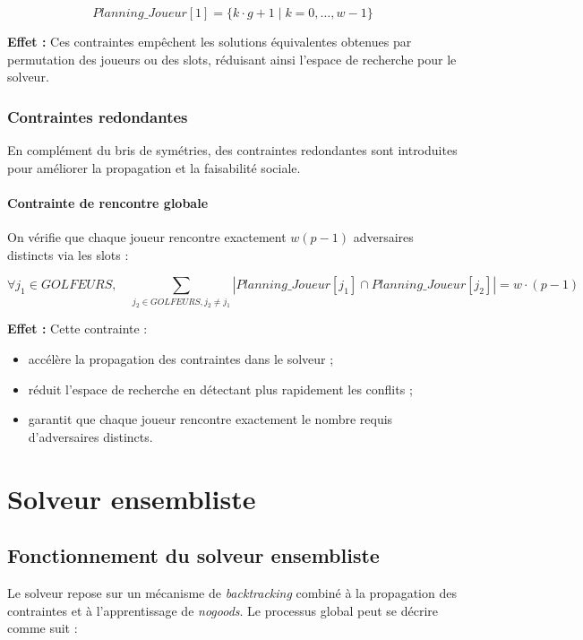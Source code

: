\documentclass{article}
\begin{document}
\[
Planning\_Joueur[1] = \{ k \cdot g + 1 \mid k = 0, \dots, w-1 \}
\]

\noindent
\textbf{Effet :} Ces contraintes empêchent les solutions équivalentes obtenues par permutation des joueurs ou des slots, réduisant ainsi l’espace de recherche pour le solveur.

\subsubsection{Contraintes redondantes}

En complément du bris de symétries, des contraintes redondantes sont introduites pour améliorer la propagation et la faisabilité sociale.

\paragraph{Contrainte de rencontre globale}
On vérifie que chaque joueur rencontre exactement $w(p-1)$ adversaires distincts via les slots :

\[
\forall j_1 \in GOLFEURS, \quad
\sum_{j_2 \in GOLFEURS, j_2 \neq j_1} |Planning\_Joueur[j_1] \cap Planning\_Joueur[j_2]| = w \cdot (p-1)
\]

\noindent
\textbf{Effet :} Cette contrainte :
\begin{itemize}
    \item accélère la propagation des contraintes dans le solveur ;
    \item réduit l’espace de recherche en détectant plus rapidement les conflits ;
    \item garantit que chaque joueur rencontre exactement le nombre requis d’adversaires distincts.
\end{itemize}


\section{Solveur ensembliste}

\subsection{Fonctionnement du solveur ensembliste}

Le solveur repose sur un mécanisme de \emph{backtracking} combiné à la propagation des contraintes et à l'apprentissage de \emph{nogoods}. 
Le processus global peut se décrire comme suit :
\end{document}
